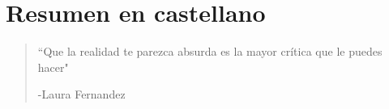 \chapter{Resumen en castellano}



\begin{quotation}
	\vspace{-3cm}
    \begin{flushright}
    \begin{minipage}[t][5cm][b]{0.5\textwidth}
    { ``Que la realidad te parezca absurda es la mayor crítica que le puedes hacer"}
    
    \bigskip
    
    -{\small  Laura Fernandez}
    \end{minipage}
    \end{flushright}
    
    \vspace{0.5cm}
\end{quotation}